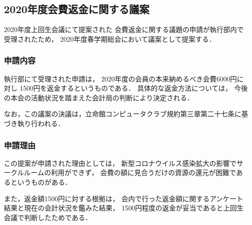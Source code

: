 \subsection*{2020年度会費返金に関する議案}

2020年度上回生会議にて提案された
会費返金に関する議題の申請が執行部内で受理されたため，
2020年度春学期総会において議案として提案する．

\subsubsection*{申請内容}
執行部にて受理された申請は，
2020年度の会員の本来納めるべき会費6000円に対し
1500円を返金するというものである．
具体的な返金方法については，
今後の本会の活動状況を踏まえた会計局の判断により決定される．

なお，この議案の決議は，立命館コンピュータクラブ規約第三章第二十七条に基づき執り行われる．

\subsubsection*{申請理由}
この提案が申請された理由としては，
新型コロナウイルス感染拡大の影響でサークルルームの利用ができず，
会費の額に見合うだけの資源の還元が困難であるというものがある．

また，返金額1500円に対する根拠は，
会内で行った返金額に関するアンケート結果と現在の会計状況を鑑みた結果，
1500円程度の返金が妥当であると上回生会議で判断したためである．

